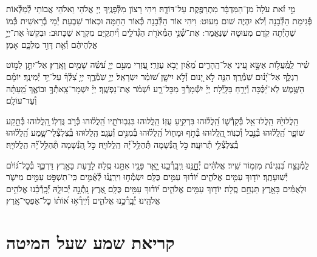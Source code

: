 \documentclass[twoside, openany, parskip=half, 11pt]{book}
\begin{document}
מִ֣י זֹ֗את עֹלָה֙ מִן־הַמִּדְבָּ֔ר מִתְרַפֶּ֖קֶת עַל־דּוֹדָ֑הּ׃
וִיהִי רָצוֹן מִלְּ֯פָנֶֽיךָ יְיָ אֱלֹהַי וֵאלֹהֵי אֲבוֹתַי לְ֯מַלְּ֯אוֹת פְּ֯גִימַת הַלְּ֯בָנָה וְ֯לֹא יִהְיֶה שׁוּם מִעוּט: וִיהִי אוֹר הַלְּ֯בָנָה כְּ֯אוֹר הַחַמָּה וּכְאוֹר שִׁבְעַת יְ֯מֵי בְ֯רֵאשִׁית כְּ֯מוֹ שֶׁהָיְ֯תָה קֹֽדֶם מִעוּטָהּ שֶׁנֶּאֱמַר:
אֶת־שְׁ֯נֵ֥י הַמְּ֯אֹרֹ֖ת הַגְּ֯דֹלִ֑ים וְ֯יִתְקַיַּם מִקְרָא שֶׁכָּתוּב: וּבִקְשׁוּ֙ אֶת־יְיָ֣ אֱלֹֽהֵיהֶ֔ם וְ֯אֵ֖ת דָּוִ֣ד מַלְכָּ֑ם אָמֵן׃


שִׁ֗יר לַֽמַּֽ֫עֲל֥וֹת אֶשָּׂ֣א עֵ֭ינַי אֶל־הֶֽהָרִ֑ים מֵ֝אַ֗יִן יָבֹ֥א עֶזְרִֽי׃ עֶ֭זְרִי מֵעִ֣ם יְיָ֑ עֹ֝שֵׂ֗ה שָׁמַ֥יִם וָאָֽרֶץ׃ אַל־יִתֵּ֣ן לַמּ֣וֹט רַגְלֶ֑ךָ אַל־יָ֝נ֗וּם שֹֽׁמְ֯רֶֽךָ׃ הִנֵּ֤ה לֹ֣א יָ֭נוּם וְ֯לֹ֣א יִישָׁ֑ן שׁ֝וֹמֵ֗ר יִשְׂרָאֵֽל׃ יְיָ֥ שֹֽׁמְ֯רֶ֑ךָ יְיָ֥ צִ֝לְּ֯ךָ֗ עַל־יַ֥ד יְ֯מִינֶֽךָ׃ יוֹמָ֗ם הַשֶּׁ֥מֶשׁ לֹֽא־יַ֝כֶּ֗כָּה וְ֯יָרֵ֥חַ בַּלָּֽיְ֯לָה׃ יְיָ֗ יִשְׁ֯מָרְ֯ךָ֥ מִכׇּל־רָ֑ע יִ֝שְׁמֹ֗ר אֶת־נַפְשֶֽׁךָ׃ יְיָ֗ יִשְׁמָר־צֵֽאתְ֯ךָ֥ וּבוֹאֶ֑ךָ מֵֽ֝עַתָּ֗ה וְ֯עַד־עוֹלָֽם׃

הַֽלֲלוּיָ֙הּ הַֽלֲלוּ־אֵ֥ל בְּ֯קָדְ֯שׁ֑וֹ הַֽ֝לֲל֗וּהוּ בִּרְקִ֥יעַ עֻזּֽוֹ׃
הַֽלֲלוּהוּ בִּגְבֽוּרֹתָ֑יו הַֽ֝לֲל֗וּהוּ כְּ֯רֹ֣ב גֻּדְלֽוֹ׃
֖הַֽלֲלוּהוּ בְּ֯תֵ֣קַע שׁוֹפָ֑ר הַֽ֝לֲל֗וּהוּ בְּ֯נֵ֣בֶל וְ֯כִנּֽוֹר׃
֖הַֽלֲלוּהוּ בְּ֯תֹ֣ף וּמָח֑וֹל הַֽ֝לֲל֗וּהוּ בְּ֯מִנִּ֥ים וְ֯עֻגָֽב׃
הַֽלֲלוּהוּ בְּֽ֯צִלְצְ֯לֵי־שָׁ֑מַע הַֽ֝לֲל֗וּהוּ בְּֽ֯צִלְצְ֯לֵ֥י תְ֯רוּעָֽה׃
כֹּ֣ל הַ֭נְּ֯שָׁמָה תְּ֯הַלֵּ֥ל ֝יָ֗הּ הַֽלֲלוּיָֽהּ׃
כֹּ֣ל הַ֭נְּ֯שָׁמָה תְּ֯הַלֵּ֥ל ֝יָ֗הּ הַֽלֲלוּיָֽהּ׃

\enlargethispage{\baselineskip}
לַֽמְ֯נַצֵּ֥ח
בִּ֝נְגִינֹ֗ת מִזְמ֥וֹר שִֽׁיר׃ אֱלֹהִ֗ים יְ֯חׇׇׇׇׇנֵּ֥נוּ וִֽיבָֽרְ֯כֵ֑נוּ יָ֤אֵ֥ר פָּנָ֖יו אִתָּ֣נוּ סֶֽלָה׃ לָדַ֣עַת בָּאָ֣רֶץ דַּרְכֶּ֑ךָ בְּ֯כׇל־גּ֝וֹיִ֗ם יְ֯שֽׁוּעָתֶֽךָ׃ יוֹד֖וּךָ עַמִּ֥ים אֱלֹהִ֑ים י֝וֹד֗וּךָ עַמִּ֥ים כֻּלָּֽם׃ יִשְׂמְ֯ח֥וּ וִירַֽנֲנ֗וּ לְ֯אֻ֫מִּ֥ים כִּֽי־תִשְׁפֹּ֣ט עַמִּ֣ים מִישֹׁ֑ר וּלְאֻמִּ֓ים בָּאָ֖רֶץ תַּנְחֵ֣ם סֶֽלָה׃ יוֹד֖וּךָ עַמִּ֥ים אֱלֹהִ֑ים י֝וֹד֗וּךָ עַמִּ֥ים כֻּלָּֽם׃ אֶ֭רֶץ נָֽתְ֯נָ֣ה יְ֯בוּלָ֑הּ יְ֝֯בָֽרְ֯כֵ֗נוּ אֱלֹהִ֥ים אֱלֹהֵֽינוּ׃ יְ֯בָֽרְ֯כֵ֥נוּ אֱלֹהִ֑ים וְ֯יִֽירְ֯א֥וּ א֝וֹת֗וֹ כׇּל־אַפְסֵי־אָֽרֶץ׃


\chapter[קריאת שמע שעל המיטה]{ קריאת שמע שעל המיטה }

\shema

\veahavta
\end{document}
